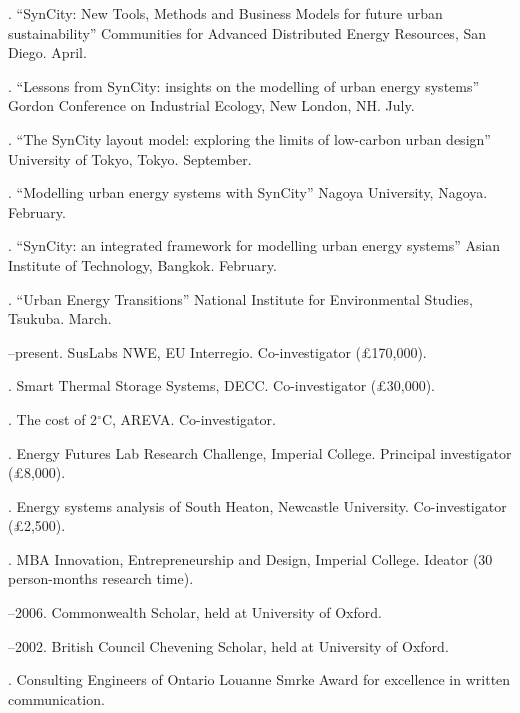 \documentclass[11pt,a4paper]{article}
\begin{document}
. ``SynCity: New Tools, Methods and Business Models for future urban sustainability'' Communities for Advanced Distributed Energy Resources, San Diego.  April.

. ``Lessons from SynCity: insights on the modelling of urban energy systems'' Gordon Conference on Industrial Ecology, New London, NH.  July.

. ``The SynCity layout model: exploring the limits of low-carbon urban design'' University of Tokyo, Tokyo.  September.

. ``Modelling urban energy systems with SynCity'' Nagoya University, Nagoya. February.

. ``SynCity: an integrated framework for modelling urban energy systems'' Asian Institute of Technology, Bangkok. February.

. ``Urban Energy Transitions'' National Institute for Environmental Studies, Tsukuba.  March.


\bigskip

\noindent{}%
%
%
--present.  SusLabs NWE, EU Interregio.  Co-investigator (£170,000).

. Smart Thermal Storage Systems, DECC.  Co-investigator (£30,000).

. The cost of 2$^\circ$C, AREVA.  Co-investigator.

. Energy Futures Lab Research Challenge, Imperial College.  Principal investigator (£8,000).

. Energy systems analysis of South Heaton, Newcastle University.  Co-investigator (£2,500).

. MBA Innovation, Entrepreneurship and Design, Imperial College.  Ideator (30 person-months research time).

--2006.  Commonwealth Scholar, held at University of Oxford.

--2002.  British Council Chevening Scholar, held at University of Oxford.

.  Consulting Engineers of Ontario Louanne Smrke Award for excellence in written communication.
\end{document}
